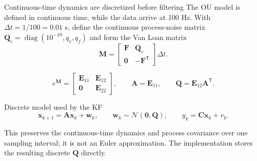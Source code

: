 \documentclass[aspectratio=169,11pt]{beamer}
\begin{document}
\begin{frame}{Continuous-time dynamics are discretized before filtering}
  \small
  The OU model is defined in continuous time, while the data arrive at 100 Hz.
  With $\Delta t=1/100=0.01$ s, define the continuous process-noise matrix
  $\mathbf Q_c=\operatorname{diag}(10^{-10},q_v,q_f)$ and form the Van Loan matrix
  \[
    \mathbf M=\begin{bmatrix}
      \mathbf F & \mathbf Q_c\\
      \mathbf 0 & -\mathbf F^{\mathsf T}
    \end{bmatrix}\Delta t.
  \]

  \[
    e^{\mathbf M}=\begin{bmatrix}
      \mathbf E_{11} & \mathbf E_{12}\\
      \mathbf 0 & \mathbf E_{22}
    \end{bmatrix},
    \qquad
    \mathbf A=\mathbf E_{11},
    \qquad
    \mathbf Q=\mathbf E_{12}\mathbf A^{\mathsf T}.
  \]

  \begin{block}{Discrete model used by the KF}
    \[
      \mathbf x_{k+1}=\mathbf A\mathbf x_k+\mathbf w_k,
      \qquad \mathbf w_k\sim\mathcal N(\mathbf 0,\mathbf Q),
      \qquad y_k=\mathbf C\mathbf x_k+v_k.
    \]
  \end{block}

  \centering
  \footnotesize
  This preserves the continuous-time dynamics and process covariance over one sampling interval;
  it is not an Euler approximation. The implementation stores the resulting discrete $\mathbf Q$ directly.
\end{frame}
\end{document}
